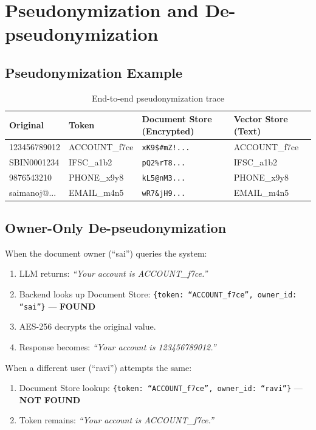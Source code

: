 \section{Pseudonymization and De-pseudonymization}

\subsection{Pseudonymization Example}

\begin{table}[H]
\centering
\caption{End-to-end pseudonymization trace}
\label{tab:pseudo_trace}
\begin{tabular}{llll}
\toprule
\textbf{Original} & \textbf{Token} & \textbf{Document Store (Encrypted)} & \textbf{Vector Store (Text)} \\
\midrule
123456789012 & ACCOUNT\_f7ce & \texttt{xK9\$\#mZ!...} & ACCOUNT\_f7ce \\
SBIN0001234 & IFSC\_a1b2 & \texttt{pQ2\%rT8...} & IFSC\_a1b2 \\
9876543210 & PHONE\_x9y8 & \texttt{kL5@nM3...} & PHONE\_x9y8 \\
saimanoj@... & EMAIL\_m4n5 & \texttt{wR7\&jH9...} & EMAIL\_m4n5 \\
\bottomrule
\end{tabular}
\end{table}

\subsection{Owner-Only De-pseudonymization}

When the document owner (``sai'') queries the system:
\begin{enumerate}
    \item LLM returns: \textit{``Your account is ACCOUNT\_f7ce.''}
    \item Backend looks up Document Store: \texttt{\{token: ``ACCOUNT\_f7ce'', owner\_id: ``sai''\}} --- \textbf{FOUND}
    \item AES-256 decrypts the original value.
    \item Response becomes: \textit{``Your account is 123456789012.''}
\end{enumerate}

When a different user (``ravi'') attempts the same:
\begin{enumerate}
    \item Document Store lookup: \texttt{\{token: ``ACCOUNT\_f7ce'', owner\_id: ``ravi''\}} --- \textbf{NOT FOUND}
    \item Token remains: \textit{``Your account is ACCOUNT\_f7ce.''}
\end{enumerate}

